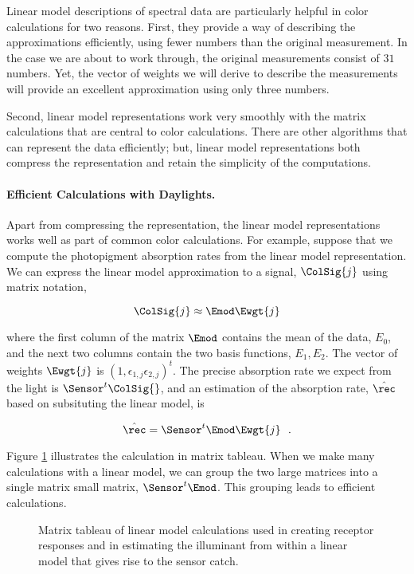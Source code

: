 Linear model descriptions of spectral data are particularly
helpful in color calculations for two reasons.
First, they
provide a way of describing the approximations
efficiently, using fewer numbers than the original measurement.
In the case we are about to work through, the original
measurements consist of $31$ numbers.
Yet, the vector of weights we will derive to describe
the measurements will provide an excellent approximation
using only three numbers.

Second, linear model representations work very
smoothly with the matrix calculations that are
central to color calculations.
There are other algorithms that can
represent the data efficiently; but,
linear model representations both compress
the representation and retain the simplicity of the computations.

\paragraph{Efficient Calculations with Daylights. }
Apart from compressing the representation,
the linear model representations works
well as part of common color calculations.
For example, suppose that
we compute the photopigment absorption rates from the linear
model representation.
We can express the linear model
approximation to a signal, $\ColSig{j}$ using matrix notation,

\begin{equation}
\label{e8:linMod}
\ColSig{j} \approx {\Emod} \Ewgt{j}
\end{equation}

where the first column of the matrix $\Emod$ contains
the mean of the data,
$E_0$, and the next two columns contain
the two basis functions, $E_1, E_2$.
The vector of weights $\Ewgt{j}$ is
$(1 , \epsilon_{1,j} \epsilon_{2,j})^{t}$.
The precise absorption rate we expect from the
light is $\Sensor^t \ColSig{}$, and
an estimation of the absorption rate,
$\hat{\rec}$ based on subsituting the linear model, is 

\begin{equation}
\label{e8:linModForward}
\hat{\rec} = \Sensor^t \Emod \Ewgt{j} ~~.
\end{equation}

Figure \ref{f8:sigEst} illustrates the calculation
in matrix tableau.
When we make many calculations with a linear model, 
we can group the two large matrices into a single matrix
small matrix, $\Sensor^t \Emod$.
This grouping leads to efficient calculations.
\begin{figure}
\caption[Linear Model Calculation Tableau]{
Matrix tableau of linear model calculations
used in creating receptor responses and in estimating
the illuminant from within a linear model that gives
rise to the sensor catch.}
\label{f8:sigEst}
\end{figure}


